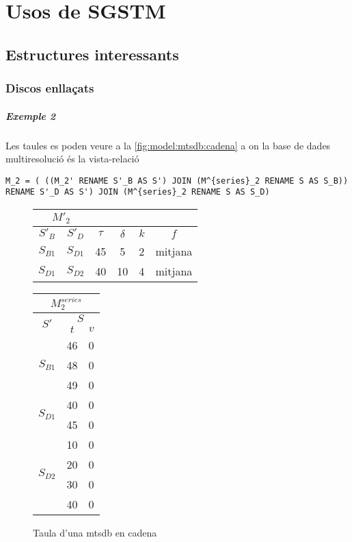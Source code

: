 \chapter{Usos de SGSTM}



\section{Estructures interessants}



\subsection{Discos enllaçats}



\paragraph{Exemple 2}

Les taules es poden veure a la \autoref{fig:model:mtsdb:cadena} a on la base de dades multiresolució és la vista-relació 
\begin{verbatim}
M_2 = ( ((M_2' RENAME S'_B AS S') JOIN (M^{series}_2 RENAME S AS S_B)) RENAME S'_D AS S') JOIN (M^{series}_2 RENAME S AS S_D)
\end{verbatim}



\begin{figure}[tp]
  \centering
  \begin{tabular}{|c|c|c|c|c|c|}
    \multicolumn{2}{c}{$M'_2$} \\ \hline
    $S'_B$  & $S'_D$ & $\tau$ & $\delta$ & $k$ & $f$ \\ \hline
    $S_{B1}$ & $S_{D1}$ & 45 & 5  & 2 & mitjana  \\
    $S_{D1}$ & $S_{D2}$ & 40 & 10 & 4 & mitjana  \\ \hline
  \end{tabular}\qquad
  \begin{tabular}{|c|c|c|}
    \multicolumn{3}{c}{$M^{series}_{2}$} \\ \hline
    \multirow{2}{*}{$S'$}  &  \multicolumn{2}{c|}{$S$} \\ \cline{2-3}
    & $t$      & $v$  \\ \hline
    \multirow{3}{*}{$S_{B1}$} & 46 & 0 \\ 
    & 48 & 0 \\ 
    & 49 & 0 \\ \hline
    \multirow{2}{*}{$S_{D1}$} & 40 & 0 \\ 
    & 45 & 0 \\ \hline
    \multirow{4}{*}{$S_{D2}$} & 10 & 0 \\ 
    & 20 & 0 \\ 
    & 30 & 0 \\ 
    & 40 & 0 \\ \hline
  \end{tabular}
  \caption{Taula d'una mtsdb en cadena}
  \label{fig:model:mtsdb:cadena}
\end{figure}


